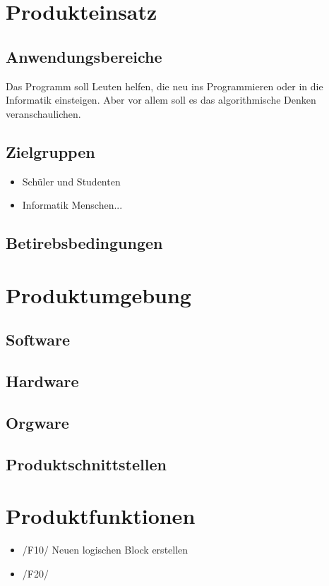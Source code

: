 \documentclass[a4paper,10pt]{report}
\begin{document}
\section{Produkteinsatz}
\subsection{Anwendungsbereiche}
Das Programm soll Leuten helfen, die neu ins Programmieren oder in die Informatik einsteigen. Aber vor allem soll es das algorithmische Denken veranschaulichen.
\subsection{Zielgruppen}
\begin{itemize}
\item Schüler und Studenten
\item Informatik Menschen...
\end{itemize}
\subsection{Betirebsbedingungen}

\section{Produktumgebung}
\subsection{Software}
\subsection{Hardware}
\subsection{Orgware}
\subsection{Produktschnittstellen}

\section{Produktfunktionen}
\begin{itemize}
\item /F10/ Neuen logischen Block erstellen
\item /F20/ 
\end{itemize}
\end{document}
